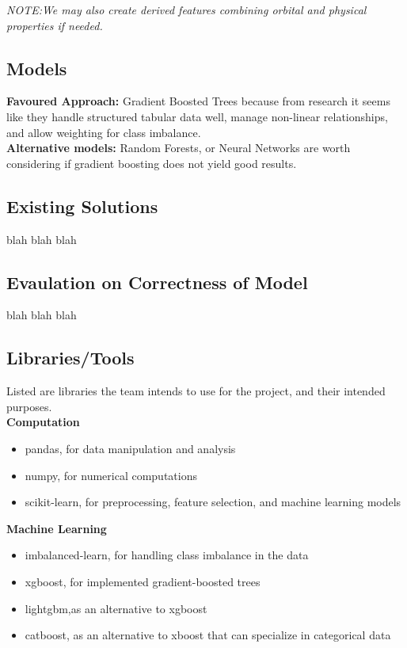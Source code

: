 \documentclass{article}
\begin{document}
\emph{NOTE:We may also create derived features combining orbital and physical properties if needed.}


\subsection*{Models}
\medskip
\textbf{Favoured Approach:} Gradient Boosted Trees because from research it seems like they handle structured tabular data well, manage non-linear relationships, and allow weighting for class imbalance. \\
\medskip
\textbf{Alternative models:} Random Forests, or Neural Networks are worth considering if gradient boosting does not yield good results.

\medskip

\subsection*{Existing Solutions}
\medskip
blah blah blah



\subsection*{Evaulation on Correctness of Model}

blah
blah
blah
\subsection*{Libraries/Tools}
Listed are libraries the team intends to use for the project, and their intended purposes. \\
\textbf{Computation}
\begin{itemize}
    \item pandas, for data manipulation and analysis
    \item numpy, for numerical computations
    \item scikit-learn, for preprocessing, feature selection, and machine learning models
\end{itemize}

\textbf{Machine Learning}
\begin{itemize}
    \item imbalanced-learn, for handling class imbalance in the data
    \item xgboost, for implemented gradient-boosted trees
    \item lightgbm,as an alternative to xgboost
    \item catboost, as an alternative to xboost that can specialize in categorical data
\end{itemize}
\end{document}
